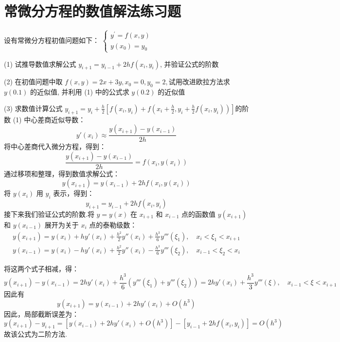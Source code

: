 \section{常微分方程的数值解法练习题}
   \begin{tcolorbox}[breakable,enhanced,arc=0mm,outer arc=0mm,
		boxrule=0pt,toprule=1pt,leftrule=0pt,bottomrule=1pt, rightrule=0pt,left=0.2cm,right=0.2cm,
		titlerule=0.5em,toptitle=0.1cm,bottomtitle=-0.1cm,top=0.2cm,
		colframe=white!10!biru,colback=white!90!biru,coltitle=white,
            coltext=black,title =2024-04, title style={white!10!biru}, before skip=8pt, after skip=8pt,before upper=\hspace{2em},
		fonttitle=\bfseries,fontupper=\normalsize]

 设有常微分方程初值问题如下：
$
\left\{\begin{array}{c}
y^{\prime}=f(x, y) \\
y\left(x_{0}\right)=y_{0}
\end{array}\right.
$

(1) 试推导数值求解公式 $ y_{i+1}=y_{i-1}+2 hf\left(x_{i}, y_{i}\right) $, 并验证公式的阶数

(2) 在初值问题中取 $ f(x, y)=2 x+3 y, x_{0}=0, y_{0}=2, $试用改进欧拉方法求 $ y(0.1) $ 的近似值, 并利用 (1) 中的公式求 $ y(0.2) $ 的近似值

(3) 求数值计算公式
$y_{i+1}=y_{i}+\frac{h}{2}\left[f\left(x_{i}, y_{i}\right)+f\left(x_{i}+\frac{h}{2}, y_{i}+\frac{h}{2} f\left(x_{i}, y_{i}\right)\right)\right]$的阶数
\tcblower
(1) %
中心差商近似导数：
$$
y'(x_i) \approx \frac{y(x_{i+1}) - y(x_{i-1})}{2h}
$$
将中心差商代入微分方程，得到：
$$
\frac{y(x_{i+1}) - y(x_{i-1})}{2h} = f(x_i, y(x_i))
$$
通过移项和整理，得到数值求解公式：
$$
y(x_{i+1}) = y(x_{i-1}) + 2hf(x_i, y(x_i))
$$
将 $ y(x_i) $ 用 $ y_i $ 表示，得到：
$$
y_{i+1} = y_{i-1} + 2hf(x_i, y_i)
$$
接下来我们验证公式的阶数.将 $ y = y(x) $ 在 $ x_{i+1} $ 和 $ x_{i-1} $ 点的函数值 $ y(x_{i+1}) $ 和 $ y(x_{i-1}) $ 展开为关于 $ x_i $ 点的泰勒级数：
$$
\begin{array}{l}
y(x_{i+1}) = y(x_i) + hy'(x_i) + \frac{h^2}{2} y''(x_i) + \frac{h^3}{6} y'''(\xi_1), \quad x_i < \xi_1 < x_{i+1} \\
y(x_{i-1}) = y(x_i) - hy'(x_i) + \frac{h^2}{2} y''(x_i) - \frac{h^3}{6} y'''(\xi_2), \quad x_{i-1} < \xi_2 < x_i
\end{array}
$$

将这两个式子相减，得：
$$
y(x_{i+1}) - y(x_{i-1}) = 2h y'(x_i) + \frac{h^3}{6} \left( y'''(\xi_1) + y'''(\xi_2) \right)=2h y'(x_i) + \frac{h^3}{3} y'''(\xi),\quad x_{i-1} < \xi < x_{i+1}
$$
因此有
$$
y(x_{i+1}) = y(x_{i-1}) + 2h y'(x_i) + O(h^3)
$$
因此，局部截断误差为：
$$y(x_{i+1})-y_{i+1}=[ y(x_{i-1}) + 2h y'(x_i) + O(h^3)]-[ y_{i-1} + 2hf(x_i, y_i)]=O(h^3)$$
故该公式为二阶方法.


\end{tcolorbox}
